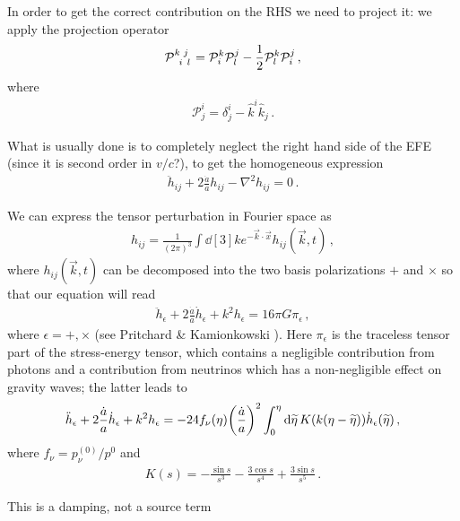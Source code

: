 \documentclass[main.tex]{subfiles}
\begin{document}
In order to get the correct contribution on the RHS we need to project it: we apply the projection operator 
%
\begin{align}
\tensor{\mathcal{P}}{^{k}_{i}^{j}_{l}} =
\mathcal{P}^{k}_{i} \mathcal{P}^{j}_{l}
- \frac{1}{2} \mathcal{P}^{k}_{l} \mathcal{P}^{j}_{i}
\,,
\end{align}
%
where 
%
\begin{align}
\mathcal{P}^{i}_{j} = \delta^{i}_{j} - \hat{k}^{i}\hat{k}_{j}
\,.
\end{align}


What is usually done is to completely neglect the right hand side of the EFE (since it is second order in \(v/c\)?), to get the homogeneous expression 
%
\begin{align}
\ddot{h}_{ij} + 2 \frac{\dot{a}}{a} h_{ij} - \nabla^2 h_{ij} = 0
\,.
\end{align}

We can express the tensor perturbation in Fourier space as 
%
\begin{align}
h_{ij} = \frac{1}{(2\pi )^3} \int \dd[3]{k} e^{- \vec{k} \cdot \vec{x}}
h_{ij} (\vec{k}, t)
\,,
\end{align}
%
where \(h_{ij} (\vec{k}, t)\) can be decomposed into the two basis polarizations \(+\) and \(\times \)
so that our equation will read 
%
\begin{align}
\ddot{h}_{\epsilon } + 2 \frac{\dot{a}}{a} \dot{h}_{\epsilon } + k^2 h_{\epsilon } = 16 \pi G \pi_{\epsilon }
\,,
\end{align}
%
where \(\epsilon = +, \times \) (see Pritchard \& Kamionkowski \cite[]{pritchardCosmicMicrowaveBackground2005}). 
Here \(\pi_{\epsilon } \) is the traceless tensor part of the stress-energy tensor, which contains a negligible contribution from photons and a contribution from neutrinos which has a non-negligible effect on gravity waves; the latter leads to 
%
\begin{align}
\ddot{h}_{\epsilon } + 2 \frac{\dot{a}}{a} \dot{h}_{\epsilon }
+ k^2 h_{\epsilon } =
-24 f_{\nu }(\eta ) \qty(\frac{\dot{a}}{a})^2
\int_{0}^{\eta } \dd{\widetilde{\eta} } K (k (\eta - \widetilde{\eta})) \dot{h}_{\epsilon }(\widetilde{\eta})
\,,
\end{align}
%
where \(f_{\nu } = p_{\nu }^{(0)} / p^{0}\) and 
%
\begin{align}
K(s) = - \frac{\sin s}{s^3} - \frac{3 \cos s}{s^{4}}
+ \frac{3 \sin s}{s^{5}}
\,.
\end{align}

This is a damping, not a source term

\end{document}
